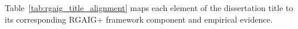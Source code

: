 \normalsize\normalfont\color{black}

Table~\ref{tab:rgaig_title_alignment} maps each element of the dissertation title to its corresponding RGAIG+ framework component and empirical evidence.

